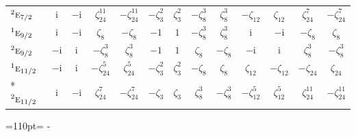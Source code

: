 \documentclass[10pt,a4paper]{article}
\newcommand{\needspace}[1]{\par\penalty-100\begingroup\dimen0=#1\relax\dimen2=\pagegoal
  \advance\dimen2-\pagetotal\ifdim\dimen0>\dimen2\relax\ifdim\dimen2>0pt\vfil\break\fi\fi
  \endgroup}
\numberwithin{equation}{section}
\newcommand{\irr}[1]{\text{\normalfont\scshape #1}}
\newcommand{\conjpair}[1]{{}^{#1}}
\newcommand{\iunit}{\mathrm{i}}
\newcommand{\rootunity}[1]{\zeta_{#1}}
\begin{document}
{\begin{longtable}{@{}lcccccccccccc@{}}
$\conjpair{2}\irr{e}_{7/2}$ & $\iunit{}$ & $-\iunit{}$ & $\rootunity{24}^{11}$ & $-\rootunity{24}^{11}$ & $-\rootunity{3}^{2}$ & $\rootunity{3}^{2}$ & $-\rootunity{8}^{3}$ & $\rootunity{8}^{3}$ & $-\rootunity{12}$ & $\rootunity{12}$ & $\rootunity{24}^{7}$ & $-\rootunity{24}^{7}$\\
$\conjpair{1}\irr{e}_{9/2}$ & $\iunit{}$ & $-\iunit{}$ & $\rootunity{8}$ & $-\rootunity{8}$ & $-1$ & $1$ & $-\rootunity{8}^{3}$ & $\rootunity{8}^{3}$ & $\iunit{}$ & $-\iunit{}$ & $-\rootunity{8}$ & $\rootunity{8}$\\
$\conjpair{2}\irr{e}_{9/2}$ & $-\iunit{}$ & $\iunit{}$ & $-\rootunity{8}^{3}$ & $\rootunity{8}^{3}$ & $-1$ & $1$ & $\rootunity{8}$ & $-\rootunity{8}$ & $-\iunit{}$ & $\iunit{}$ & $\rootunity{8}^{3}$ & $-\rootunity{8}^{3}$\\
$\conjpair{1}\irr{e}_{11/2}$ & $-\iunit{}$ & $\iunit{}$ & $-\rootunity{24}^{5}$ & $\rootunity{24}^{5}$ & $-\rootunity{3}^{2}$ & $\rootunity{3}^{2}$ & $-\rootunity{8}$ & $\rootunity{8}$ & $\rootunity{12}$ & $-\rootunity{12}$ & $-\rootunity{24}$ & $\rootunity{24}$\\*
$\conjpair{2}\irr{e}_{11/2}$ & $\iunit{}$ & $-\iunit{}$ & $\rootunity{24}^{7}$ & $-\rootunity{24}^{7}$ & $-\rootunity{3}$ & $\rootunity{3}$ & $\rootunity{8}^{3}$ & $-\rootunity{8}^{3}$ & $-\rootunity{12}^{5}$ & $\rootunity{12}^{5}$ & $\rootunity{24}^{11}$ & $-\rootunity{24}^{11}$\\
\bottomrule\end{longtable}}
\needspace{110pt}
\end{document}
